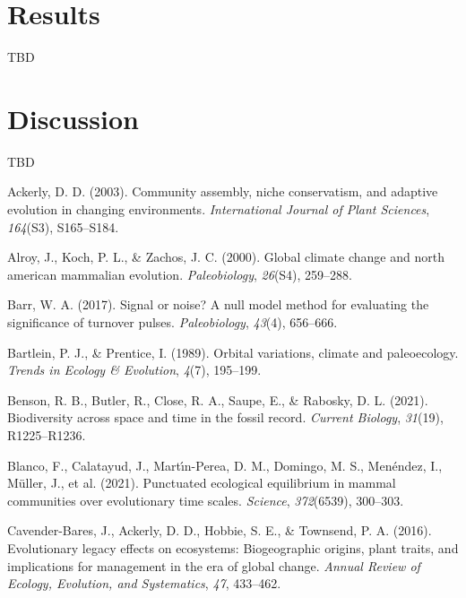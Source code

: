 \documentclass[
]{agujournal2019}
\newlength{\cslhangindent}
\newenvironment{CSLReferences}[2] %
 {\begin{list}{}{%
  \setlength{\itemindent}{0pt}
  \setlength{\leftmargin}{0pt}
  \setlength{\parsep}{0pt}
  \ifodd #1
   \setlength{\leftmargin}{\cslhangindent}
   \setlength{\itemindent}{-1\cslhangindent}
  \fi
  \setlength{\itemsep}{#2\baselineskip}}}
 {\end{list}}
\begin{document}
\section{Results}\label{results}

TBD

\section{Discussion}\label{discussion}

TBD

\label{refs}
\begin{CSLReferences}{1}{0}
Ackerly, D. D. (2003). Community assembly, niche conservatism, and
adaptive evolution in changing environments. \emph{International Journal
of Plant Sciences}, \emph{164}(S3), S165--S184.

Alroy, J., Koch, P. L., \& Zachos, J. C. (2000). Global climate change
and north american mammalian evolution. \emph{Paleobiology},
\emph{26}(S4), 259--288.

Barr, W. A. (2017). Signal or noise? A null model method for evaluating
the significance of turnover pulses. \emph{Paleobiology}, \emph{43}(4),
656--666.

Bartlein, P. J., \& Prentice, I. (1989). Orbital variations, climate and
paleoecology. \emph{Trends in Ecology \& Evolution}, \emph{4}(7),
195--199.

Benson, R. B., Butler, R., Close, R. A., Saupe, E., \& Rabosky, D. L.
(2021). Biodiversity across space and time in the fossil record.
\emph{Current Biology}, \emph{31}(19), R1225--R1236.

Blanco, F., Calatayud, J., Martı́n-Perea, D. M., Domingo, M. S.,
Menéndez, I., Müller, J., et al. (2021). Punctuated ecological
equilibrium in mammal communities over evolutionary time scales.
\emph{Science}, \emph{372}(6539), 300--303.

Cavender-Bares, J., Ackerly, D. D., Hobbie, S. E., \& Townsend, P. A.
(2016). Evolutionary legacy effects on ecosystems: Biogeographic
origins, plant traits, and implications for management in the era of
global change. \emph{Annual Review of Ecology, Evolution, and
Systematics}, \emph{47}, 433--462.


\end{CSLReferences}
\end{document}
